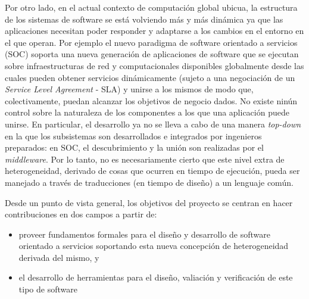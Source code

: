\documentclass[a4paper, 11pt]{article}
\begin{document}
  Por otro lado, en el actual contexto de computación global ubicua, la estructura de los sistemas de software se está volviendo más y más dinámica ya que las aplicaciones necesitan poder responder y adaptarse a los cambios en el entorno en el que operan. Por ejemplo el nuevo paradigma de software orientado a servicios (SOC) soporta una nueva generación de aplicaciones de software que se ejecutan  sobre infraestructuras de red y computacionales disponibles globalmente desde las cuales pueden obtener servicios dinámicamente (sujeto a una negociación de un \emph{Service Level Agreement} - SLA) y unirse a los mismos de modo que, colectivamente, puedan alcanzar los objetivos de negocio dados. No existe ninún control sobre la naturaleza de los componentes a los que una aplicación puede unirse. En particular, el desarrollo ya no se lleva a cabo de una manera \emph{top-down} en la que los subsistemas son desarrollados e integrados por ingenieros preparados: en SOC, el descubrimiento y la unión son realizadas por el \emph{middleware}. Por lo tanto, no es necesariamente cierto que este nivel extra de heterogeneidad, derivado de cosas que ocurren en tiempo de ejecución, pueda ser manejado a través de traducciones (en tiempo de diseño) a un lenguaje común. 
  
  Desde un punto de vista general, los objetivos del proyecto se centran en hacer contribuciones en dos campos a partir de:
  \begin{itemize}
   \item proveer fundamentos formales para el diseño y desarrollo de software orientado a servicios soportando esta nueva concepción de heterogeneidad derivada del mismo, y
   \item el desarrollo de herramientas para el diseño, valiación y verificación de este tipo de software
  \end{itemize}
\end{document}

